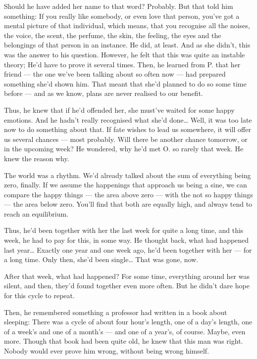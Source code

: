 Should he have added her name to that word?
Probably. But that told him something: If you really like somebody, or even love that person, you've got a mental picture of that individual, which means, that you recognise all the noises, the voice, the scent, the perfume, the skin, the feeling, the eyes and the belongings of that person in an instance. 
He did, at least. 
And as she didn't, this was the answer to his question. 
However, he felt that this was quite an instable theory; He'd have to prove it several times. 
Then, he learned from P. that her friend --- the one we've been talking about so often now --- had prepared something she'd shown him. That meant that she'd planned to do so some time before --- and as we know, plans are never realised to our benefit.

Thus, he knew that if he'd offended her, she must've waited for some happy emotions. And he hadn't really recognised what she'd done\ldots
Well, it was too late now to do something about that. If fate wishes to lead us somewhere, it will offer us several chances --- most probably. 
Will there be another chance tomorrow, or in the upcoming week?
He wondered, why he'd met O. so rarely that week. 
He knew the reason why.

The world was a rhythm. 
We'd already talked about the sum of everything being zero, finally. If we assume the happenings that approach us being a sine, we can compare the happy things --- the area above zero --- with the not so happy things --- the area below zero. 
You'll find that both are equally high, and always tend to reach an equilibrium. 

Thus, he'd been together with her the last week for quite a long time, and this week, he had to pay for this, in some way. He thought back, what had happened last year\ldots
Exactly one year and one week ago, he'd been together with her --- for a long time. Only then, she'd been single\ldots
That was gone, now.

After that week, what had happened?
For some time, everything around her was silent, and then, they'd found together even more often. 
But he didn't dare hope for this cycle to repeat.

Then, he remembered something a professor had written in a book about sleeping: There was a cycle of about four hour's length, one of a day's length, one of a week's and one of a month's --- and one of a year's, of course. 
Maybe, even more. 
Though that book had been quite old, he knew that this man was right. 
Nobody would ever prove him wrong, without being wrong himself.

